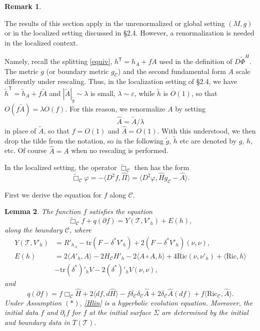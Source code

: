 \documentclass[10pt]{amsart}
\renewcommand{\d}{\delta}
\newcommand{\e}{\varepsilon}
\newcommand{\f}{\varphi}
\newcommand{\Si}{\Sigma}
\renewcommand{\l}{\lambda}
\newcommand{\cC}{{\mathcal C}}
\newcommand{\cT}{{\mathcal T}}
\newcommand{\Ric}{\mathrm{Ric}}
\newcommand{\tT}{\mathsf{T}}
\newcommand{\be}{\begin{equation}}
\newcommand{\ee}{\end{equation}}
\newcommand{\tr}{\mathrm{tr}}
\newcommand{\p}{\partial}
\renewcommand{\hat}{\widehat}
\newcommand{\<}{\langle}
\renewcommand{\>}{\rangle}
\newcommand{\w}{\widetilde}
\theoremstyle{plain}
\newtheorem{lemma}{Lemma}[section]
\theoremstyle{remark}
\theoremstyle{definition}
\newtheorem{remark}[lemma]{Remark}
\numberwithin{equation}{section}
\begin{document}
\begin{remark} \label{renorm} 
{\rm The results of this section apply in the unrenormalized or global setting $(M, g)$ or in the localized setting discussed in \S 2.4. However, a 
renormalization is needed in the localized context. 

   Namely, recall the splitting \eqref{equiv}, $h^{\tT} = h_A + f A$ used in the definition of $D\w \Phi^H$. The metric $g$ (or boundary metric 
$g_{\cC}$) and the second fundamental form $A$ scale differently under rescaling. Thus, in the localization 
setting of \S 2.4, we have $\w h^{\tT} = \w h_A + f\w A$ and $|\w A|_{\w g} \sim \l$ is small, $\l \sim \e$, while $\w h$ is $O(1)$, so that $O(f\w A) = 
\l O(f)$. For this reason, we 
renormalize $A$ by setting 
\be \label{Arenorm}
\hat A = \w A/\l 
\ee
in place of $\w A$, so that $f = O(1)$ and $\hat A = O(1)$. With this understood, we then drop the tilde from the notation, so in the following 
$\w g$, $\w h$ etc are denoted by $g$, $h$, etc. Of course $\hat A = A$ when no rescaling is performed. 

In the localized setting, the operator $\w \Box_{\cC}$ then has the form 
$$\w \Box_{\cC}\f = -\<D^2f, \hat \Pi\> = \<D^2 \f, \hat H g_{\cC} - \hat A\>.$$
}
\end{remark}

 First we derive the equation for $f$ along $\cC$. 
  
\begin{lemma}
The function $f$ satisfies the equation 
\be \label{Hlin}
\w \Box_\cC f  + q(\p f) = Y(\cT, V'_h) + E(h),
\ee
along the boundary $\cC$, where 
\be \label{finhom}
\begin{split}
Y(\cT, V'_h) &= R'_{h_A} - \tr(F-\d^* V'_h) + 2(F-\d^* V'_h)(\nu,\nu),\\
E(h) &= 2\<A'_h, A\> - 2H_\cC H'_h - 2\<A\circ A, h\> + 4\Ric(\nu,\nu'_h) + \<\Ric, h\>\\
&- \tr(\d^*)'_h V - 2(\d^*)'_h V(\nu,\nu),
\end{split}
\ee
and 
\be \label{qf} 
q(\p f) = f\Box_{\cC}\hat H + 2\<df, d\hat H\> - f\d_{\cC}\d_{\cC}\hat A + 2\d_{\cC}\hat A(df) + f\<\Ric_{\cC}, \hat A\>.
\ee
Under Assumption $(*)$, \eqref{Hlin} is a hyperbolic evolution equation. Moreover, the initial data $f$ and $\p_t f$ for $f$ at the initial surface 
$\Si$ are determined by the initial and boundary data in $T(\cT)$. 
\end{lemma} 
\end{document}
